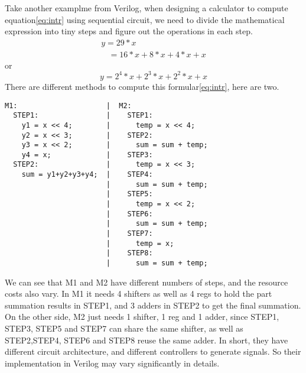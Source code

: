 Take another examplme from Verilog, when designing a calculator to compute equation\eqref{eq:intr} using sequential circuit, we need to divide the mathematical expression into tiny steps and figure out the operations in each step.
%
\begin{equation}\begin{array}{lr}
y = 29 * x \\
\:\:\:\:= 16 * x + 8 * x + 4 * x + x
\end{array}
\end{equation}
or
\begin{equation}
y =  2^4 * x + 2^3 * x + 2^2 * x + x
\label{eq:intr}
\end{equation}
%
There are different methods to compute this formular\eqref{eq:intr}, here are two.
%
\begin{verbatim}
M1:                     |  M2:
  STEP1:                |    STEP1:
    y1 = x << 4;        |      temp = x << 4;
    y2 = x << 3;        |    STEP2:
    y3 = x << 2;        |      sum = sum + temp;
    y4 = x;             |    STEP3:
  STEP2:                |      temp = x << 3;
    sum = y1+y2+y3+y4;  |    STEP4:
                        |      sum = sum + temp;
                        |    STEP5:
                        |      temp = x << 2;
                        |    STEP6:
                        |      sum = sum + temp;
                        |    STEP7:
                        |      temp = x;
                        |    STEP8:
                        |      sum = sum + temp;
\end{verbatim}
We can see that M1 and M2 have different numbers of steps, and the resource costs also vary. In M1 it needs 4 shifters as well as 4 regs to hold the part summation results in STEP1, and 3 adders in STEP2 to get the final summation. On the other side, M2 just needs 1 shifter, 1 reg and 1 adder, since STEP1, STEP3, STEP5 and STEP7 can share the same shifter, as well as STEP2,STEP4, STEP6 and STEP8 reuse the same adder.
In short, they have different circuit architecture, and different controllers to generate signals. So their implementation in Verilog may vary significantly in details.

